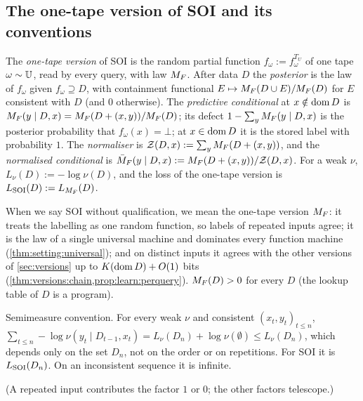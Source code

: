 \subsection{The one-tape version of SOI and its conventions}\label{sec:setting:sfi}

\begin{definition}\label{def:setting:sfi}
The \emph{one-tape version} of SOI is the random partial function $f_\omega:=f^{T_U}_\omega$ of one tape $\omega\sim\mathbb{U}$, read by every query, with law $M_{F}$. After data $D$ the \emph{posterior} is the law of $f_\omega$ given $f_\omega\supseteq D$, with containment functional $E\mapsto M_{F}(D\cup E)/M_{F}(D)$ for $E$ consistent with $D$ (and $0$ otherwise). The \emph{predictive conditional} at $x\notin\operatorname{dom} D$ is $M_{F}(y\mid D,x)=M_{F}(D+(x,y))/M_{F}(D)$; its defect $1-\sum_yM_{F}(y\mid D,x)$ is the posterior probability that $f_\omega(x)=\bot$; at $x\in\operatorname{dom} D$ it is the stored label with probability $1$. The \emph{normaliser} is $\mathcal{Z}(D,x):=\sum_yM_{F}(D+(x,y))$, and the \emph{normalised conditional} is $\bar{M}_{F}(y\mid D,x):=M_{F}(D+(x,y))/\mathcal{Z}(D,x)$. For a weak $\nu$, $L_\nu(D):=-\log\nu(D)$, and the loss of the one-tape version is $L_{\mathrm{SOI}}(D):=L_{M_{F}}(D)$.
\end{definition}

When we say SOI without qualification, we mean the one-tape version $M_{F}$: it treats the labelling as one random function, so labels of repeated inputs agree; it is the law of a single universal machine and dominates every function machine (\cref{thm:setting:universal}); and on distinct inputs it agrees with the other versions of \cref{sec:versions} up to $K(\operatorname{dom} D)+O(1)$ bits (\cref{thm:versions:chain,prop:learn:perquery}). $M_{F}(D)>0$ for every $D$ (the lookup table of $D$ is a program).

\begin{proposition}\label{prop:setting:order}
Semimeasure convention. For every weak $\nu$ and consistent $(x_t,y_t)_{t\le n}$, $\sum_{t\le n}-\log\nu(y_t\mid D_{t-1},x_t)=L_\nu(D_n)+\log\nu(\emptyset)\le L_\nu(D_n)$, which depends only on the set $D_n$, not on the order or on repetitions. For SOI it is $L_{\mathrm{SOI}}(D_n)$. On an inconsistent sequence it is infinite.
\end{proposition}

(A repeated input contributes the factor $1$ or $0$; the other factors telescope.)

